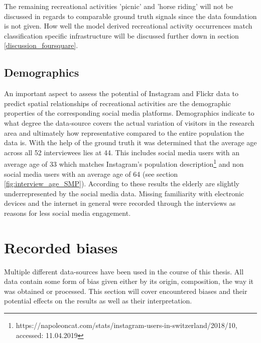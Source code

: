 The remaining recreational activities 'picnic' and 'horse riding' will not be discussed in regards to comparable ground truth signals since the data foundation is not given. How well the model derived recreational activity occurrences match classification specific infrastructure will be discussed further down in section \ref{discussion_foursquare}.\\

\subsection{Demographics}
An important aspect to assess the potential of Instagram and Flickr data to predict spatial relationships of recreational activities are the demographic properties of the corresponding social media platforms. Demographics indicate to what degree the data-source covers the actual variation of visitors in the research area and ultimately how representative compared to the entire population the data is. With the help of the ground truth it was determined that the average age across all 52 interviewees lies at 44. This includes social media users with an average age of 33 which matches Instagram's population description\footnote{https://napoleoncat.com/stats/instagram-users-in-switzerland/2018/10, accessed: 11.04.2019} and non social media users with an average age of 64 (see section \ref{fig:interview_age_SMP}). According to these results the elderly are slightly underrepresented by the social media data. Missing familiarity with electronic devices and the internet in general were recorded through the interviews as reasons for less social media engagement. 

\section{Recorded biases} \label{discussion_rec_bias}
Multiple different data-sources have been used in the course of this thesis. All data contain some form of bias given either by its origin, composition, the way it was obtained or processed. 
This section will cover encountered biases and their potential effects on the results as well as their interpretation.

